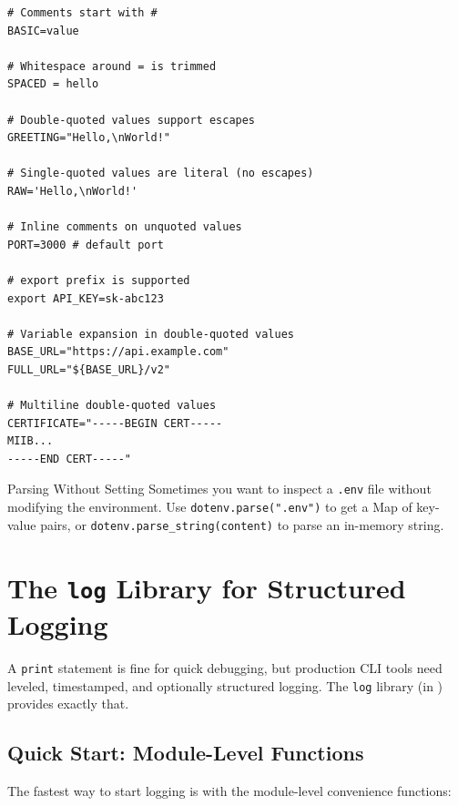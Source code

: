 \begin{lstlisting}[language={}, caption={A feature-rich .env file}]
# Comments start with #
BASIC=value

# Whitespace around = is trimmed
SPACED = hello

# Double-quoted values support escapes
GREETING="Hello,\nWorld!"

# Single-quoted values are literal (no escapes)
RAW='Hello,\nWorld!'

# Inline comments on unquoted values
PORT=3000 # default port

# export prefix is supported
export API_KEY=sk-abc123

# Variable expansion in double-quoted values
BASE_URL="https://api.example.com"
FULL_URL="${BASE_URL}/v2"

# Multiline double-quoted values
CERTIFICATE="-----BEGIN CERT-----
MIIB...
-----END CERT-----"
\end{lstlisting}

\begin{tipbox}{Parsing Without Setting}
Sometimes you want to inspect a \texttt{.env} file without modifying the environment.
Use \lstinline|dotenv.parse(".env")| to get a Map of key-value pairs, or \lstinline|dotenv.parse_string(content)| to parse an in-memory string.
\end{tipbox}

\section{The \texttt{log} Library for Structured Logging}\label{sec:log-library}


A \lstinline|print| statement is fine for quick debugging, but production CLI tools need leveled, timestamped, and optionally structured logging.
The \lstinline|log| library (in ) provides exactly that.

\subsection{Quick Start: Module-Level Functions}\label{sec:log-quick-start}

The fastest way to start logging is with the module-level convenience functions:

